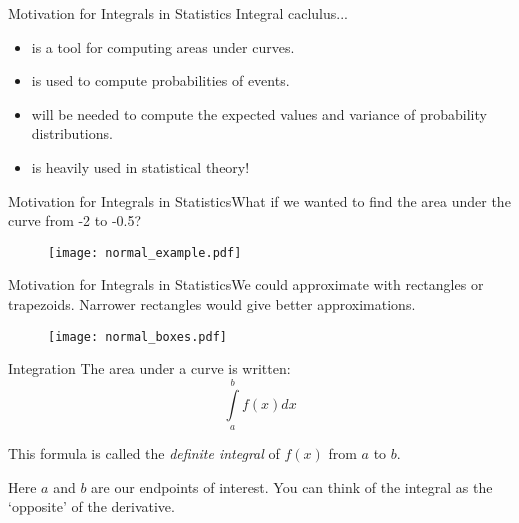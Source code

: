 \documentclass{beamer}
\begin{document}
\begin{frame}{Motivation for Integrals in Statistics}
Integral caclulus...
\begin{itemize}
\item is a tool for computing areas under curves.
\item is used to compute probabilities of events.
\item will be needed to compute the expected values and variance of probability distributions.
\item is heavily used in statistical theory!
\end{itemize}
\end{frame}


\begin{frame}{Motivation for Integrals in Statistics}{What if we wanted to find the area under the curve from -2 to -0.5?}
\begin{figure}[h!]\centering
    \texttt{[image: normal\_example.pdf]}
\end{figure}
\end{frame}


\begin{frame}{Motivation for Integrals in Statistics}{We could approximate with rectangles or trapezoids.  Narrower rectangles would give better approximations.}
\begin{figure}[h!]\centering
    \texttt{[image: normal\_boxes.pdf]}
\end{figure}
\end{frame}

\begin{frame}{Integration}
The area under a curve is written:
\[
\int\limits_a^bf(x)dx
\]

This formula is called the \textit{definite integral} of $f(x)$ from $a$ to $b$.  

\vspace{3mm}
Here $a$ and $b$ are our endpoints of interest.   You can think of the integral as the `opposite' of the derivative.

\end{frame}
\end{document}
